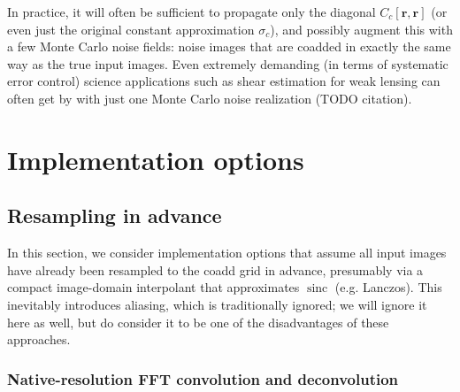 \documentclass[DM,authoryear,toc]{lsstdoc}
\DeclareMathOperator{\sinc}{sinc}
\begin{document}
In practice, it will often be sufficient to propagate only the diagonal $C_c\!\left[\symbf{r}, \symbf{r}\right]$ (or even just the original constant approximation $\sigma_c$), and possibly augment this with a few Monte Carlo noise fields: noise images that are coadded in exactly the same way as the true input images.
Even extremely demanding (in terms of systematic error control) science applications such as shear estimation for weak lensing can often get by with just one Monte Carlo noise realization (TODO citation).

\section{Implementation options}

\label{sec:implementation-options}

\subsection{Resampling in advance}

\label{sec:prewarped}

In this section, we consider implementation options that assume all input images have already been resampled to the coadd grid in advance, presumably via a compact image-domain interpolant that approximates $\sinc$ (e.g. Lanczos).
This inevitably introduces aliasing, which is traditionally ignored; we will ignore it here as well, but do consider it to be one of the disadvantages of these approaches.

\subsubsection{Native-resolution FFT convolution and deconvolution}

\label{sec:prewarped-fft}
\end{document}
